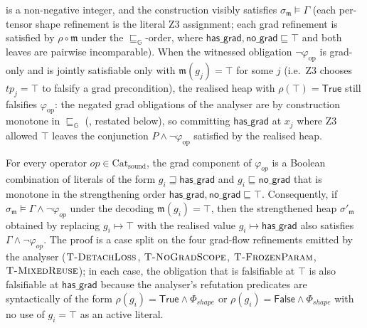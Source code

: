 \begin{definition}
is a non-negative integer, and the construction visibly
satisfies $\sigma_{\mathfrak{m}}\models\Gamma$ (each
per-tensor shape refinement is the literal Z3 assignment;
each grad refinement is satisfied by $\rho\circ\mathfrak{m}$
under the $\sqsubseteq_{\mathbb{G}}$-order, where
$\mathsf{has\_grad},\mathsf{no\_grad}\sqsubseteq\top$ and
both leaves are pairwise incomparable). When the witnessed
obligation $\neg\varphi_{\mathrm{op}}$ is grad-only and is
jointly satisfiable only with $\mathfrak{m}(g_j)=\top$ for
some $j$ (i.e.\ Z3 chooses $\mathit{tp}_j=\top$ to falsify a
grad precondition), the realised heap with
$\rho(\top)=\mathsf{True}$ still falsifies
$\varphi_{\mathrm{op}}$: the negated grad obligations of the
analyser are by construction monotone in
$\sqsubseteq_{\mathbb{G}}$ (, restated
below), so committing $\mathsf{has\_grad}$ at $x_j$ where Z3
allowed $\top$ leaves the conjunction
$P\wedge\neg\varphi_{\mathrm{op}}$ satisfied by the
realised heap.
\end{definition}

\begin{lemma}
\label{lem:gradmono}
For every operator $\mathit{op}\in\mathrm{Cat}_{\mathrm{sound}}$,
the grad component of $\varphi_{\mathit{op}}$ is a Boolean
combination of literals of the form
$g_i\sqsupseteq\mathsf{has\_grad}$ and
$g_i\sqsubseteq\mathsf{no\_grad}$ that is monotone in the
strengthening order $\mathsf{has\_grad},\mathsf{no\_grad}
\sqsubseteq\top$. Consequently, if
$\sigma_{\mathfrak{m}}\models\Gamma\wedge\neg\varphi_{\mathit{op}}$
under the decoding $\mathfrak{m}(g_i)=\top$, then the
strengthened heap $\sigma'_{\mathfrak{m}}$ obtained by
replacing $g_i\mapsto\top$ with the realised value
$g_i\mapsto\mathsf{has\_grad}$ also satisfies
$\Gamma\wedge\neg\varphi_{\mathit{op}}$. The proof is a
case split on the four grad-flow refinements emitted by the
analyser
($\textsc{T-DetachLoss}$, $\textsc{T-NoGradScope}$,
$\textsc{T-FrozenParam}$, $\textsc{T-MixedReuse}$);
in each case, the obligation that is falsifiable at $\top$ is
also falsifiable at $\mathsf{has\_grad}$ because the
analyser's refutation predicates are syntactically of the
form $\rho(g_i)=\mathsf{True}\wedge\Phi_{\mathit{shape}}$
or $\rho(g_i)=\mathsf{False}\wedge\Phi_{\mathit{shape}}$ with
no use of $g_i=\top$ as an active literal.
\end{lemma}

